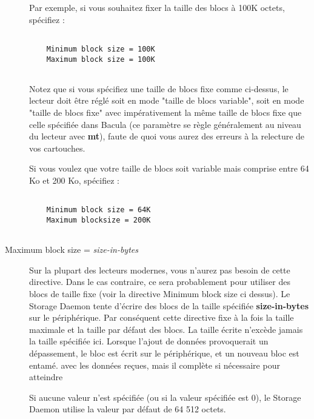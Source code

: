 \begin{description}
  Par exemple, si vous souhaitez fixer la taille des blocs \`a 100K octets, sp\'ecifiez :
   
\footnotesize
\begin{verbatim}
 
    Minimum block size = 100K
    Maximum block size = 100K
    
\end{verbatim}
\normalsize
   Notez que si vous sp\'ecifiez une taille de blocs fixe comme ci-dessus, le 
   lecteur doit \^etre r\'egl\'e soit en mode "taille de blocs variable", soit en 
   mode "taille de blocs fixe" avec imp\'erativement la m\^eme taille de blocs 
   fixe que celle sp\'ecifi\'ee dans Bacula (ce param\`etre se r\`egle g\'en\'eralement 
   au niveau du lecteur avec {\bf mt}), faute de quoi vous aurez des erreurs \`a 
   la relecture de vos cartouches.
  
   Si vous voulez que votre taille de blocs soit variable mais comprise entre 
   64 Ko et 200 Ko, sp\'ecifiez :
   
\footnotesize
\begin{verbatim}
 
    Minimum block size = 64K
    Maximum blocksize = 200K
   
\end{verbatim}
\normalsize

\item [Maximum block size = {\it size-in-bytes}]
  Sur la plupart des lecteurs modernes, vous n'aurez pas besoin de cette
  directive. Dans le cas contraire, ce sera probablement pour utiliser 
  des blocs de taille fixe (voir la directive  Minimum block size ci dessus). 
  Le Storage Daemon tente d'\'ecrire des blocs de la taille sp\'ecifi\'ee 
  {\bf size-in-bytes} sur le p\'eriph\'erique. Par cons\'equent cette 
  directive fixe \`a la fois la taille maximale et la taille par d\'efaut 
  des blocs. La taille \'ecrite n'exc\`ede jamais la taille sp\'ecifi\'ee ici. 
  Lorsque l'ajout de donn\'ees provoquerait un d\'epassement, le bloc est 
  \'ecrit sur le p\'eriph\'erique, et un nouveau bloc est entam\'e.
  avec les donn\'ees re\c {c}ues, mais il compl\`ete si n\'ecessaire pour atteindre

  Si aucune valeur n'est sp\'ecifi\'ee (ou si la valeur sp\'ecifi\'ee est 0), le 
  Storage Daemon utilise la valeur par d\'efaut de 64 512 octets.
   

\end{description}
